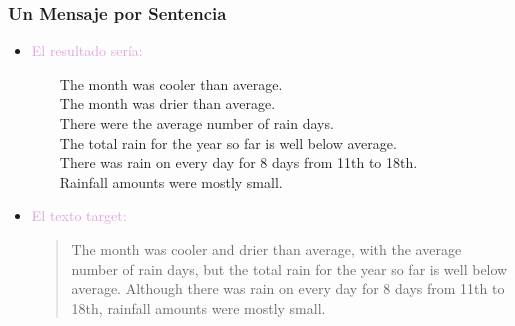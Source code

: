 \documentclass[compress,color=usenames]{beamer}
\newcommand{\mH}[1]{\textcolor{Plum}{#1}}
\begin{document}
\begin{frame}
\frametitle{Un Mensaje por Sentencia}

\begin{itemize}
\item { \mH{El resultado ser\'ia:}}

\ \ \ \  The month was cooler than average.\\
\ \ \ \  The month was drier than average.\\
\ \ \ \  There were the average number of rain days.\\
\ \ \ \  The total rain for the year so far is well below average.\\ 
\ \ \ \  There was rain on every day for 8 days from 11th to 18th.\\
\ \ \ \  Rainfall amounts were mostly small.\pause

\item { \mH{El texto target:}}
\begin{quote}
The month was cooler and drier than average, with the average number of rain days, but the total rain for the year so far is well below average. 
Although there was rain on every day for 8 days from 11th to 18th, rainfall amounts were mostly small.
\end{quote}
\end{itemize}
 
\end{frame}



% 
\end{document}
